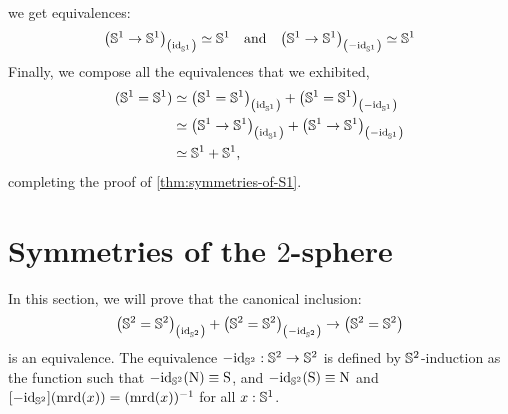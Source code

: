 \documentclass[english,a4paper]{lmcs}
\begin{document}
we get
equivalences:
\begin{displaymath}
  \conncomp{\left(\Sc \to \Sc\right)}{\id_\Sc} \weq \Sc
  \quad\text{and}\quad
  \conncomp{\left(\Sc \to \Sc\right)}{-\id_\Sc} \weq \Sc
\end{displaymath}
Finally, we compose all the equivalences that we exhibited,
\begin{align*}
  (\Sc=\Sc)
  & \weq \conncomp{\left(\Sc = \Sc\right)}{\id_\Sc}
    + \conncomp{\left(\Sc = \Sc\right)}{-\id_\Sc}
  \\
  & \weq \conncomp{\left(\Sc \to \Sc\right)}{\id_\Sc}
    + \conncomp{\left(\Sc \to \Sc\right)}{-\id_\Sc}
  \\
  & \weq \Sc + \Sc,
\end{align*}
completing the proof of \cref{thm:symmetries-of-S1}.

\section{Symmetries of the \texorpdfstring{$2$}{2}-sphere}
\label{sec:sphere}

In this section, we will prove that the canonical inclusion:
\begin{equation}
  \label{eq:goal-section-sphere}
  \conncomp{\left(\Sp = \Sp\right)}{\id_\Sp} +
  \conncomp{\left(\Sp = \Sp\right)}{-\id_\Sp}
  \to
  \left(\Sp = \Sp\right)
\end{equation}
is an equivalence. The equivalence $-\id_\Sp \from \Sp \to \Sp$ is
defined by $\Sp$-induction as the function such that
$-\id_\Sp(\north) \jdeq \south$, and $-\id_\Sp(\south) \jdeq \north$ and
$\ap{-\id_\Sp}(\mrd(x)) = \inv{(\mrd(x))}$ for all $x\from\Sc$.
\end{document}
